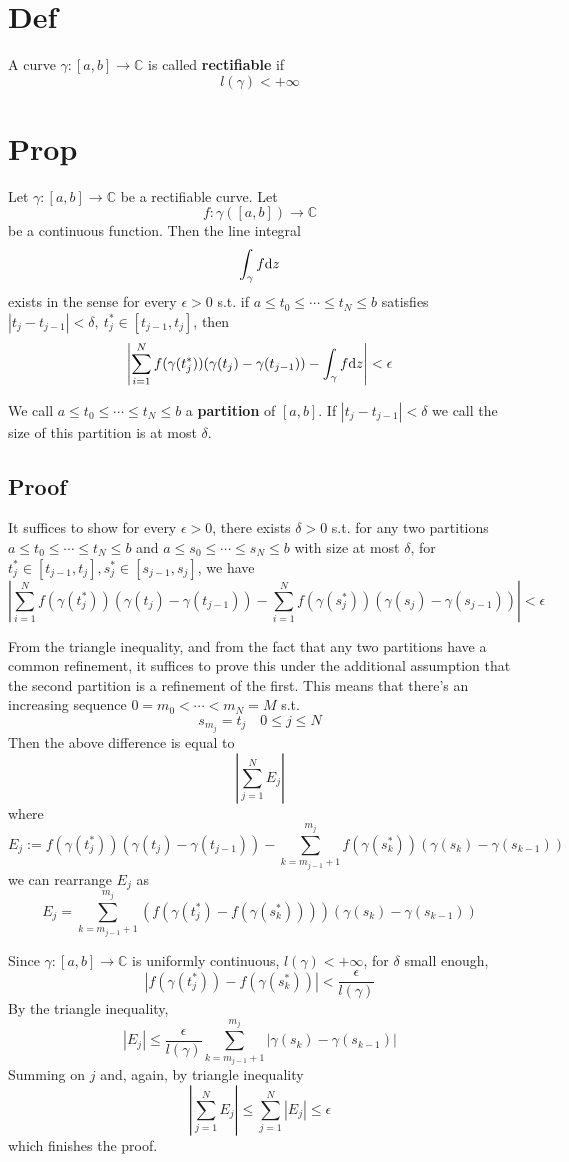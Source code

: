 \documentclass{book}
\newcommand{\abs}[1]{\left\lvert #1 \right\rvert}
\begin{document}
\section{Def}
A curve $\gamma:[a,b]\to \mathbb C$ is called \textbf{rectifiable} if $$l(\gamma)<+\infty$$
\section{Prop}
Let $\gamma:[a,b]\to \mathbb C$ be a rectifiable curve. Let $$f:\gamma([a,b])\to \mathbb C$$ be a continuous function. Then the line integral$$\int_\gamma f\text dz$$ exists in the sense for every $\epsilon>0$ s.t. if $a\leq t_0\leq \cdots\leq t_N\leq b$ satisfies $\abs{t_j-t_{j-1}}<\delta,\ t^*_j\in [t_{j-1},t_j]$, then 
$$\abs{\sum\limits_{i=1}^Nf(\gamma(t^*_j))(\gamma(t_j)-\gamma(t_{j-1}))-\int_\gamma f\text dz}<\epsilon$$

We call $a\leq t_0\leq \cdots\leq t_N\leq b$ a \textbf{partition} of $[a,b]$. If $\abs{t_j-t_{j-1}}<\delta$ we call the size of this partition is at most $\delta$.
\subsection*{Proof}
It suffices to show for every $\epsilon>0$, there exists $\delta>0$ s.t. for any two partitions $a\leq t_0\leq \cdots\leq t_N\leq b$ and $a\leq s_0\leq\cdots\leq s_N\leq b$ with size at most $\delta$, for $t^*_j\in [t_{j-1},t_j],s^*_j\in[s_{j-1},s_j]$, we have
$$\abs{\sum\limits_{i=1}^Nf(\gamma(t^*_j))(\gamma(t_j)-\gamma(t_{j-1}))-\sum\limits_{i=1}^Nf(\gamma(s^*_j))(\gamma(s_j)-\gamma(s_{j-1}))}<\epsilon$$

From the triangle inequality, and from the fact that any two partitions have a common refinement, it suffices to prove this under the additional assumption that the second partition is a refinement of the first. This means that there's an increasing sequence $0=m_0<\cdots<m_N=M$ s.t.$$s_{m_j}=t_j\quad 0\leq j\leq N$$
Then the above difference is equal to 
$$\abs{\sum\limits_{j=1}^NE_j}$$
where $$E_j:=f(\gamma(t^*_j))(\gamma(t_j)-\gamma(t_{j-1}))-\sum\limits_{k=m_{j-1}+1}^{m_j}f(\gamma(s^*_k))(\gamma(s_k)-\gamma(s_{k-1}))$$
we can rearrange $E_j$ as$$E_j=\sum\limits_{k=m_{j-1}+1}^{m_j}(f(\gamma(t^*_j)-f(\gamma(s^*_k))))(\gamma(s_k)-\gamma(s_{k-1}))$$

Since $\gamma:[a,b]\to\mathbb C$ is uniformly continuous, $l(\gamma)<+\infty$, for $\delta$ small enough, $$\abs{f(\gamma(t^*_j))-f(\gamma(s^*_k))}<\frac{\epsilon}{l(\gamma)}$$
By the triangle inequality, $$\abs{E_j}\leq\frac{\epsilon}{l(\gamma)}\sum\limits_{k=m_{j-1}+1}^{m_j}\abs{\gamma(s_k)-\gamma(s_{k-1})}$$
Summing on $j$ and, again, by triangle inequality$$\abs{\sum\limits_{j=1}^NE_j}\leq\sum\limits_{j=1}^N\abs{E_j}\leq\epsilon$$
which finishes the proof.
\end{document}
